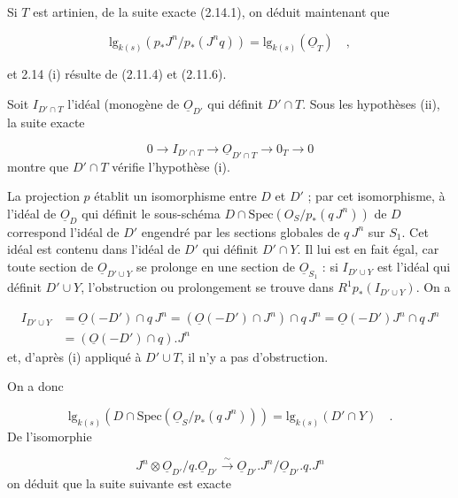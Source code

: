 Si $T$ est artinien, de la suite exacte (2.14.1), on déduit maintenant que

\begin{equation*}
\mathrm{lg}_{k(s)} (p_*J^n/p_*(J^nq)) = \mathrm{lg}_{k(s)} (\underline{O}_T) \quad , 
\end{equation*}


 et 2.14 (i) résulte de (2.11.4) et (2.11.6).

Soit $I_{D'\cap T}$ l'idéal (monogène de $\underline{O}_{D'}$ qui définit $D'\cap T$. Sous les hypothèses (ii), la suite exacte

\begin{equation*}
0 \longrightarrow I_{D'\cap T} \longrightarrow \underline{O}_{D'\cap T} \longrightarrow 0_T \longrightarrow 0
\end{equation*}
montre que $D'\cap T$ vérifie l'hypothèse (i).

La projection $p$ établit un isomorphisme entre $D$ et $D'$ ; par cet isomorphisme, à l'idéal de $\underline{O}_D$ qui définit le sous-schéma $D \cap \mathrm{Spec}(O_S/p_*(q\,J^n))$ de $D$ correspond l'idéal de $D'$ engendré par les sections globales de $q\,J^n$ sur $S_1$. Cet idéal est contenu dans l'idéal de $D'$ qui définit $D'\cap Y$. Il lui est en fait égal, car toute section de $\underline{O}_{D'\cup Y}$ se prolonge en une section de $\underline{O}_{S_1}$ : si $I_{D'\cup Y}$ est l'idéal qui définit $D'\cup Y$, l'obstruction ou prolongement se trouve dans $R^1p_*(I_{D'\cup Y})$. On a

\begin{equation*}
\begin{array}{rl} I_{D'\cup Y} & = \underline{O}(-D')\cap q\,J^n = (\underline{O}(-D')\cap J^n) \cap q\,J^n = \underline{O}(-D')J^n \cap q\,J^n \\[2mm] & = (\underline{O}(-D')\cap q). J^n \end{array}
\end{equation*}
et, d'après (i) appliqué à $D'\cup T$, il n'y a pas d'obstruction.

On a donc

\begin{equation}\tag{2.14.2}
\mathrm{lg}_{k(s)} (D\cap \mathrm{Spec}(\underline{O}_S/p_*(q\,J^n))) = \mathrm{lg}_{k(s)} (D'\cap Y) \quad .
\end{equation}
De l'isomorphie

\begin{equation*}
J^n \otimes \underline{O}_{D'}/q.\underline{O}_{D'} \stackrel{\sim}{\longrightarrow} \underline{O}_{D'}.J^n/\underline{O}_{D'}.q.J^n
\end{equation*}
on déduit que la suite suivante est exacte

